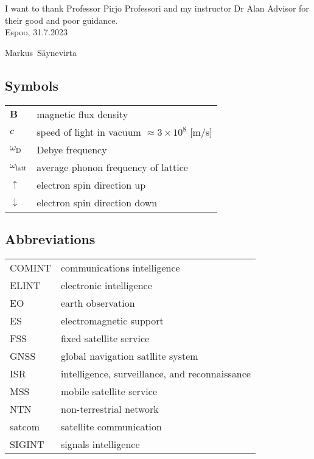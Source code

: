 \documentclass[english, 12pt, a4paper, elec, utf8, a-1b, online]{aaltothesis}
\begin{document}
I want to thank Professor Pirjo Professori and my instructor Dr Alan Advisor for their good and poor guidance.\\

\vspace{5cm}
Espoo, 31.7.2023

\vspace{5mm}
{\hfill Markus\ Säynevirta \hspace{1cm}}

\newpage

\thesistableofcontents


\subsection*{Symbols}

\begin{tabular}{ll}
$\mathbf{B}$  & magnetic flux density  \\
$c$              & speed of light in vacuum $\approx 3\times10^8$ [m/s]\\
$\omega_{\mathrm{D}}$    & Debye frequency \\
$\omega_{\mathrm{latt}}$ & average phonon frequency of lattice \\
$\uparrow$       & electron spin direction up\\
$\downarrow$     & electron spin direction down
\end{tabular}

\subsection*{Abbreviations}

\begin{tabular}{ll}
COMINT  & communications intelligence \\
ELINT   & electronic intelligence \\
EO      & earth observation \\
ES      & electromagnetic support \\
FSS     & fixed satellite service \\
GNSS    & global navigation satllite system \\
ISR     & intelligence, surveillance, and reconnaissance \\
MSS     & mobile satellite service \\
NTN     & non-terrestrial network \\
satcom  & satellite communication \\
SIGINT  & signals intelligence
\end{tabular}
\end{document}
